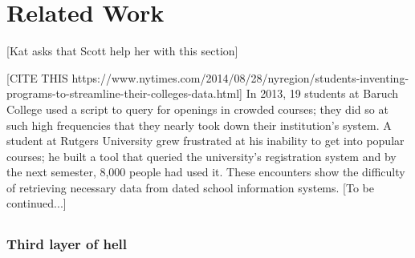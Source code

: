 \section{Related Work}
[Kat asks that Scott help her with this section]

[CITE THIS https://www.nytimes.com/2014/08/28/nyregion/students-inventing-programs-to-streamline-their-colleges-data.html] 
In 2013, 19 students at Baruch College used a script to query for openings in crowded courses; they did so at such high frequencies that they nearly took down their institution's system. A student at Rutgers University grew frustrated at his inability to get into popular courses; he built a tool that queried the university's registration system and by the next semester, 8,000 people had used it. These encounters show the difficulty of retrieving necessary data from dated school information systems. 
[To be continued...]
\subsection{}

\subsubsection{Third layer of hell}

\cite{heggen2018hiring}